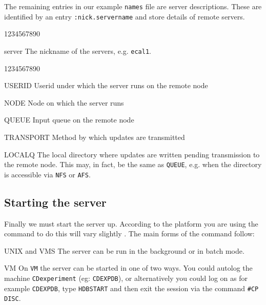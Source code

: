 \par
%
The remaining entries in our example {\tt names} file are server
descriptions. These are identified by an entry {\tt :nick.servername} and
store details of remote servers.
\par
%
\begin{DLtt}{1234567890}
\item[server]The nickname of the servers, e.g. {\tt ecal1}.
\begin{DLtt}{1234567890}
\item[USERID]Userid under which the server runs on the remote node
\item[NODE]Node on which the server runs
\item[QUEUE]Input queue on the remote node
\item[TRANSPORT]Method by which updates are transmitted
\item[LOCALQ]The local directory where updates are written pending
transmission to the remote node. This may, in fact, be the same
as {\tt QUEUE}, e.g. when the directory is accessible via {\tt NFS}
or {\tt AFS}.
\end{DLtt}
\end{DLtt}
\subsection {Starting the server}
%
%
%
Finally we must start the server up. According to the platform you are using
the command to do this will vary slightly
. The main forms of the command follow:
\par
\begin{UL}
\item UNIX and VMS
\subitem The server can be run in the background or in batch mode.
\item VM
\subitem On {\tt VM} the server can be started in one of two ways.
You could autolog the machine {\tt CDexperiment} (eg: {\tt CDEXPDB}), or
alternatively you could log on as for example {\tt CDEXPDB}, type {\tt HDBSTART}
and then exit the session via the command {\tt \#CP DISC}.
\end{UL}
%
%
%

